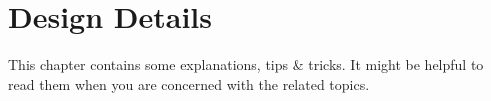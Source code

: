 \chapter{Design Details}

This chapter contains some explanations, tips \& tricks. It might be
helpful to read them when you are concerned with the related topics.



